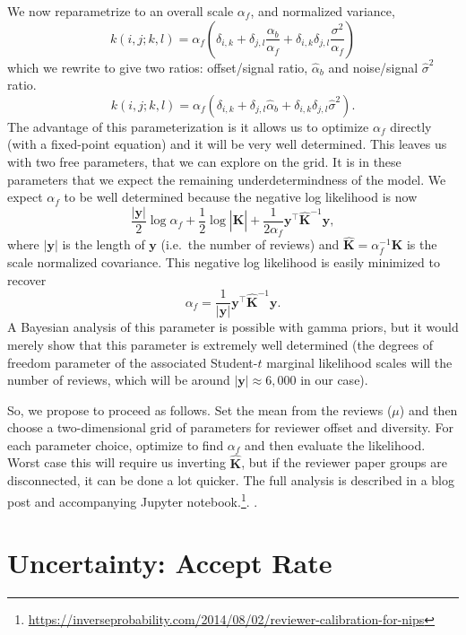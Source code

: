 We now reparametrize  to an overall scale
\(\alpha_f\), and normalized variance, \[
k(i,j; k,l) = \alpha_f\left(\delta_{i,k}  + \delta_{j,l} \frac{\alpha_b}{\alpha_f} + \delta_{i, k}\delta_{j,l} \frac{\sigma^2}{\alpha_f}\right)
\]
which we rewrite to give two ratios: offset/signal ratio,
\(\hat{\alpha}_b\) and noise/signal \(\hat{\sigma}^2\) ratio. \[
k(i,j; k,l) = \alpha_f\left(\delta_{i,k}  + \delta_{j,l} \hat{\alpha}_b + \delta_{i, k}\delta_{j,l} \hat{\sigma}^2\right).
\] 
The advantage of this parameterization is it allows us to optimize
\(\alpha_f\) directly (with a fixed-point equation) and it will be very
well determined. This leaves us with two free parameters, that we can
explore on the grid. It is in these parameters that we expect the
remaining underdetermindness of the model. We expect \(\alpha_f\) to be
well determined because the negative log likelihood is now 
\[
\frac{|\mathbf{y}|}{2}\log\alpha_f + \frac{1}{2}\log  \left|\hat{\mathbf{K}}\right| + \frac{1}{2\alpha_f}\mathbf{y}^\top \hat{\mathbf{K}}^{-1} \mathbf{y},
\]
where \(|\mathbf{y}|\) is the length of \(\mathbf{y}\) (i.e.~the
number of reviews) and \(\hat{\mathbf{K}}=\alpha_f^{-1}\mathbf{K}\) is
the scale normalized covariance. This negative log likelihood is easily
minimized to recover 
\[
\alpha_f = \frac{1}{|\mathbf{y}|} \mathbf{y}^\top \hat{\mathbf{K}}^{-1} \mathbf{y}.
\] 
A Bayesian analysis of this parameter is possible with gamma priors,
but it would merely show that this parameter is extremely well
determined (the degrees of freedom parameter of the associated
Student-\(t\) marginal likelihood scales will the number of reviews,
which will be around \(|\mathbf{y}| \approx 6,000\) in our case).

So, we propose to proceed as follows. Set the mean from the reviews
(\(\mu\)) and then choose a two-dimensional grid of parameters for
reviewer offset and diversity. For each parameter choice, optimize to
find \(\alpha_f\) and then evaluate the likelihood. Worst case this will
require us inverting \(\hat{\mathbf{K}}\), but if the reviewer paper
groups are disconnected, it can be done a lot quicker.  The full
analysis is described in a blog post and accompanying Jupyter notebook.\footnote{\url{https://inverseprobability.com/2014/08/02/reviewer-calibration-for-nips}}. .

\section{Uncertainty: Accept Rate}\label{uncertainty-accept-rate}

